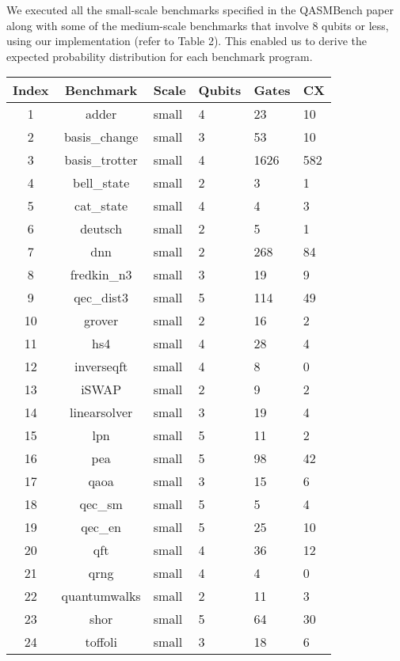 \documentclass[10pt,a4paper]{article}
\newcommand{\<}{\langle}
\renewcommand{\>}{\rangle}
\begin{document}
We executed all the small-scale benchmarks specified in the QASMBench paper along with some of the
medium-scale benchmarks that involve 8 qubits or less, using our implementation (refer to Table 2).
This enabled us to derive the expected probability distribution for each benchmark program.

\begin{table}[h]
\centering
\begin{tabularx}{\textwidth}{|c|c|X|X|X|X|}
\hline
\textbf{Index} & \textbf{Benchmark} & \textbf{Scale} & \textbf{Qubits} & \textbf{Gates} & \textbf{CX} \\
\hline
1 & adder & small & 4 & 23 & 10 \\
\hline
2 & basis\_change & small & 3 & 53 & 10 \\
\hline
3 & basis\_trotter & small & 4 & 1626 & 582 \\
\hline
4 & bell\_state & small & 2 & 3 & 1 \\
\hline
5 & cat\_state & small & 4 & 4 & 3 \\
\hline
6 & deutsch & small & 2 & 5 & 1 \\
\hline
7 & dnn & small & 2 & 268 & 84 \\
\hline
8 & fredkin\_n3 & small & 3 & 19 & 9 \\
\hline
9 & qec\_dist3 & small & 5 & 114 & 49 \\
\hline
10 & grover & small & 2 & 16 & 2 \\
\hline
11 & hs4 & small & 4 & 28 & 4 \\
\hline
12 & inverseqft & small & 4 & 8 & 0 \\
\hline
13 & iSWAP & small & 2 & 9 & 2 \\
\hline
14 & linearsolver & small & 3 & 19 & 4 \\
\hline
15 & lpn & small & 5 & 11 & 2 \\
\hline
16 & pea & small & 5 & 98 & 42 \\
\hline
17 & qaoa & small & 3 & 15 & 6 \\
\hline
18 & qec\_sm & small & 5 & 5 & 4 \\
\hline
19 & qec\_en & small & 5 & 25 & 10 \\
\hline
20 & qft & small & 4 & 36 & 12 \\
\hline
21 & qrng & small & 4 & 4 & 0 \\
\hline
22 & quantumwalks & small & 2 & 11 & 3 \\
\hline
23 & shor & small & 5 & 64 & 30 \\
\hline
24 & toffoli & small & 3 & 18 & 6 \\

\end{tabularx}
\end{table}
\end{document}
